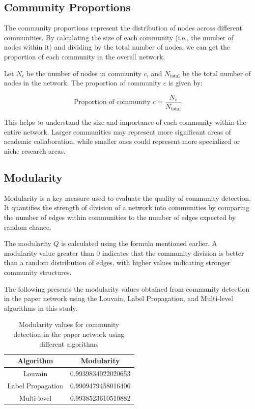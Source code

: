 \documentclass[11pt]{article}
\begin{document}
\subsection{Community Proportions}
The community proportions represent the distribution of nodes across different communities. By calculating the size of each community (i.e., the number of nodes within it) and dividing by the total number of nodes, we can get the proportion of each community in the overall network.

Let \( N_c \) be the number of nodes in community \( c \), and \( N_{\text{total}} \) be the total number of nodes in the network. The proportion of community \( c \) is given by:

\[
\text{Proportion of community } c = \frac{N_c}{N_{\text{total}}}
\]

This helps to understand the size and importance of each community within the entire network. Larger communities may represent more significant areas of academic collaboration, while smaller ones could represent more specialized or niche research areas.

\subsection{Modularity}

Modularity is a key measure used to evaluate the quality of community detection. It quantifies the strength of division of a network into communities by comparing the number of edges within communities to the number of edges expected by random chance.

The modularity \( Q \) is calculated using the formula mentioned earlier. A modularity value greater than 0 indicates that the community division is better than a random distribution of edges, with higher values indicating stronger community structures.

The following presents the modularity values obtained from community detection in the paper network using the Louvain, Label Propagation, and Multi-level algorithms in this study. 


\begin{table}
    \centering
    \begin{tabular}{|c|c|}
    \hline
    \textbf{Algorithm} & \textbf{Modularity} \\
    \hline
    Louvain  & 0.9939834022020653 \\
    Label Propagation  & 0.9909479458016406 \\
    Multi-level   &  0.9938523610510882 \\
    \hline
    \end{tabular}
    \caption{Modularity values for community detection in the paper network using different algorithms}
    \label{tab:my_label}
\end{table}
\end{document}

